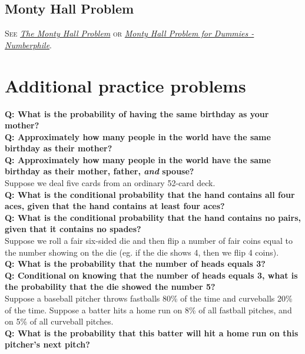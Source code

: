 \documentclass{article}
\begin{document}
\subsection*{Monty Hall Problem}
\textsc{See} \href{https://www.youtube.com/watch?v=mhlc7peGlGg\&authuser=0}{\em The Monty Hall Problem} \textsc{or} \href{https://www.youtube.com/watch?v=7u6kFlWZOWg\&authuser=0}{\em Monty Hall Problem for Dummies - Numberphile}.

\section{\sc Additional practice problems}
{\bf Q: What is the probability of having the same birthday as your mother?}\\[1em]
{\bf Q: Approximately how many people in the world have the same birthday as their mother?}\\[1em]
{\bf Q: Approximately how many people in the world have the same birthday as their mother, father, \textit{and} spouse?}\\[1em]
Suppose we deal five cards from an ordinary 52-card deck.\\
{\bf Q: What is the conditional probability that the hand contains all four aces, given that the hand contains at least four aces?}\\[1ex]
{\bf Q: What is the conditional probability that the hand contains no pairs, given that it contains no spades?}\\[1em]
Suppose we roll a fair six-sided die and then flip a number of fair coins equal to the number showing on the die (eg. if the die shows 4, then we flip 4 coins).\\
{\bf Q: What is the probability that the number of heads equals 3?}\\[1ex]
{\bf Q: Conditional on knowing that the number of heads equals 3, what is the probability that the die showed the number 5?}\\[1em]
Suppose a baseball pitcher throws fastballs 80\% of the time and curveballs 20\% of the time. Suppose a batter hits a home run on 8\% of all fastball pitches, and on 5\% of all curveball pitches.\\
{\bf Q: What is the probability that this batter will hit a home run on this pitcher's next pitch?}
\end{document}
